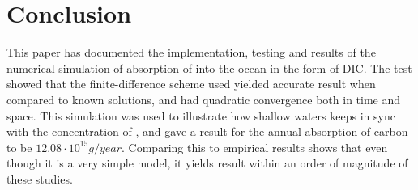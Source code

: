 \documentclass{article}
\begin{document}
    \section*{Conclusion}
    This paper has documented the implementation, testing and results of the numerical simulation of absorption of  into the ocean in the form of DIC.
    The test showed that the finite-difference scheme used yielded accurate result when compared to known solutions, and had quadratic convergence both in time and space. 
    This simulation was used to illustrate how shallow waters keeps in sync with the concentration of , and gave a result for the annual absorption of carbon to be $12.08 \cdot 10^{15} \si{g/year}$. Comparing this to empirical results shows that even though it is a very simple model, it yields result within an order of magnitude of these studies.

    \printbibliography
\end{document}
